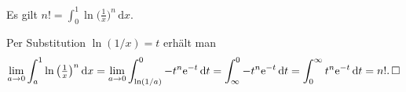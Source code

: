 \begin{Satz}
Es gilt $n! = \int_0^1 \ln\big(\frac{1}{x}\big)^n\,\mathrm dx$.
\end{Satz}
\begin{Beweis}
Per Substitution $\ln(1/x)=t$ erhält man
\[
\lim_{a\to 0}\int_a^1 \ln\big(\tfrac{1}{x}\big)^n\,\mathrm dx
= \lim_{a\to 0}\int_{\ln(1/a)}^0 -t^n\mathrm e^{-t}\,\mathrm dt
= \int_\infty^0 -t^n\mathrm e^{-t}\,\mathrm dt = \int_0^\infty t^n\mathrm e^{-t}\,\mathrm dt
= n!.\,\square
\]
\end{Beweis}
